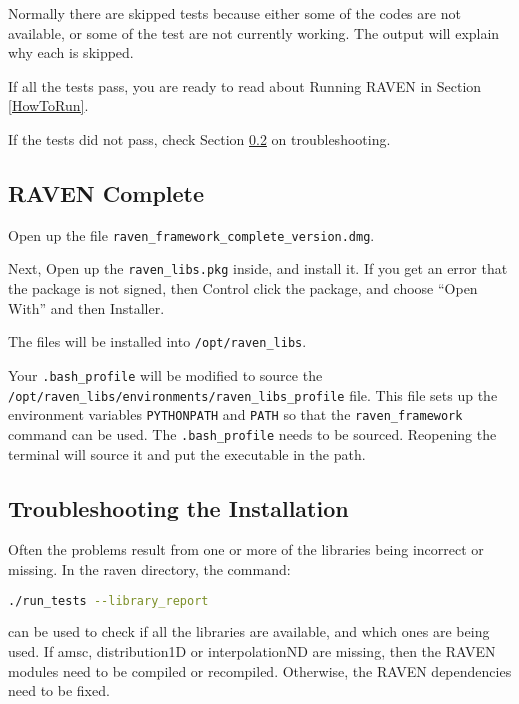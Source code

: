 Normally there are skipped tests because either some of the codes are
not available, or some of the test are not currently working.  The
output will explain why each is skipped.

If all the tests pass, you are ready to read about Running RAVEN in
Section \ref{HowToRun}.

If the tests did not pass, check Section
\ref{troubleshooting_installation} on troubleshooting.

\subsection{RAVEN Complete}
\label{raven_complete}

Open up the file \texttt{raven\_framework\_complete\_version.dmg}.

Next, Open up the \texttt{raven\_libs.pkg} inside, and install it.  If
you get an error that the package is not signed, then Control click
the package, and choose ``Open With'' and then Installer.

The files will be installed into \texttt{/opt/raven\_libs}.

Your \texttt{.bash\_profile} will be modified to source
the\\ \texttt{/opt/raven\_libs/environments/raven\_libs\_profile}
file.  This file sets up the environment variables \texttt{PYTHONPATH}
and \texttt{PATH} so that the \texttt{raven\_framework} command can be
used.  The \texttt{.bash\_profile} needs to be sourced.  Reopening the
terminal will source it and put the executable in the path.

\subsection{Troubleshooting the Installation}
\label{troubleshooting_installation}

Often the problems result from one or more of the libraries being
incorrect or missing.  In the raven directory, the command:

\begin{lstlisting}[language=bash]
./run_tests --library_report
\end{lstlisting}
can be used to check if all the libraries are available, and which
ones are being used.  If amsc, distribution1D or interpolationND are
missing, then the RAVEN modules need to be compiled or recompiled.
Otherwise, the RAVEN dependencies need to be fixed.


